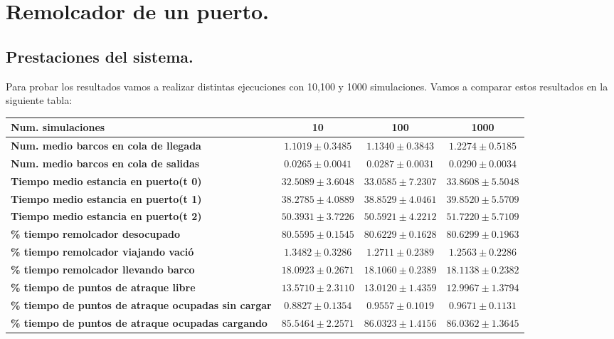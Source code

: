 \documentclass[]{article}
\begin{document}
\section{Remolcador de un puerto.}
\subsection{Prestaciones del sistema.}
Para probar los resultados vamos a realizar distintas ejecuciones con 10,100 y 1000 simulaciones. Vamos a comparar estos resultados en la siguiente tabla:

\begin{table}[H]
	\begin{center}
		\begin{tabularx}{1\textwidth}{|X|c|c|c|}
			\hline
			\textbf{Num. simulaciones}&\textbf{10} &  \textbf{100} & \textbf{1000} \\
			\hline \hline
			\textbf{Num. medio barcos en cola de llegada}& $1.1019\pm0.3485$ & $1.1340\pm0.3843$ & $1.2274\pm0.5185$ \\ \hline
			\textbf{Num. medio barcos en cola de salidas}& $0.0265\pm0.0041$ & $0.0287\pm0.0031$ & $0.0290\pm0.0034$ \\ \hline
			\textbf{Tiempo medio estancia en puerto(t 0)}& $32.5089\pm3.6048$ & $33.0585\pm7.2307$ & $33.8608\pm5.5048$ \\ \hline
			\textbf{Tiempo medio estancia en puerto(t 1)}& $38.2785\pm4.0889$ & $38.8529\pm4.0461$ & $39.8520\pm5.5709$ \\ \hline
			\textbf{Tiempo medio estancia en puerto(t 2)}& $50.3931\pm3.7226$ & $50.5921\pm4.2212$ & $51.7220\pm5.7109$ \\ \hline
			\textbf{\% tiempo remolcador desocupado}& $80.5595\pm0.1545$ & $80.6229\pm0.1628$ & $80.6299\pm0.1963$ \\ \hline
			\textbf{\% tiempo remolcador viajando vació}& $1.3482\pm0.3286$  & $1.2711\pm0.2389$ & $1.2563\pm0.2286$ \\ \hline
			\textbf{\% tiempo remolcador llevando barco}& $18.0923\pm0.2671$  & $18.1060\pm0.2389$ & $18.1138\pm0.2382$ \\ \hline
			\textbf{\% tiempo de puntos de atraque libre}& $13.5710\pm2.3110$  & $13.0120\pm1.4359$ & $12.9967\pm1.3794$ \\ \hline
			\textbf{\% tiempo de puntos de atraque ocupadas sin cargar}& $0.8827\pm0.1354$ & $0.9557\pm0.1019$ & $0.9671\pm0.1131$ \\ \hline
			\textbf{\% tiempo de puntos de atraque ocupadas cargando}& $85.5464\pm2.2571$ & $86.0323\pm1.4156$ & $86.0362\pm1.3645$ \\ \hline
		\end{tabularx}
		
	\end{center}
\end{table}
\end{document}
